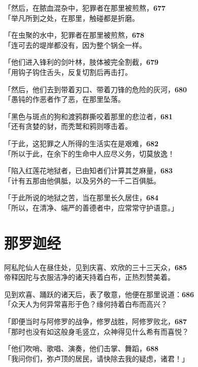 「然后，在脓血混杂中，犯罪者在那里被煎熬，\hfill{\grayfootnotesize \textbf{677}} \\
「举凡所到之处，在那里，触碰都是折磨。


「在虫聚的水中，犯罪者在那里被煎熬，\hfill{\grayfootnotesize \textbf{678}} \\
「连可去的堤岸都没有，因为整个锅全一样。


「他们进入锋利的剑叶林，肢体被完全割截，\hfill{\grayfootnotesize \textbf{679}} \\
「用钩子钩住舌头，反复切割后再击打。


「然后，他们去到带着刃口、带着刀锋的危险的灰河，\hfill{\grayfootnotesize \textbf{680}} \\
「愚钝的作恶者作了恶，在那里坠落。


「黑色与斑点的狗和渡鸦群撕咬着那里的悲泣者，\hfill{\grayfootnotesize \textbf{681}} \\
「还有贪婪的豺，而秃鹫和鸦则啄击着。


「于此，这犯罪之人所得的生活实在是艰难，\hfill{\grayfootnotesize \textbf{682}} \\
「所以于此，在余下的生命中人应尽义务，切莫放逸！


「陷入红莲花地狱者，已由知者们计算其芝麻量，\hfill{\grayfootnotesize \textbf{683}} \\
「计有五那由他俱胝，以及另外的一千二百俱胝。

「于此所说的地狱之苦，当在那里长久居住，\hfill{\grayfootnotesize \textbf{684}} \\
「所以，在清净、端严的善德者中，应常常守护语意。」

\section{那罗迦经}

阿私陀仙人在昼住处，见到庆喜、欢欣的三十三天众，\hfill{\grayfootnotesize \textbf{685}} \\
帝释因陀与衣服洁净的诸天持着白布，正热烈赞美着。


见到欢喜、踊跃的诸天后，表了敬意，他便在那里说道：\hfill{\grayfootnotesize \textbf{686}} \\
「众天人为何异常喜形于色？缘何持着白布而高兴？


「即便当时与阿修罗的战争，修罗战胜，阿修罗败北，\hfill{\grayfootnotesize \textbf{687}} \\
「那时也没有如这般身毛竖立，众神得见什么希有而喜悦？


「他们吹哨、歌唱、演奏，他们击掌、舞蹈，\hfill{\grayfootnotesize \textbf{688}} \\
「我问你们，弥卢顶的居民，请快除去我的疑虑，诸君！」


